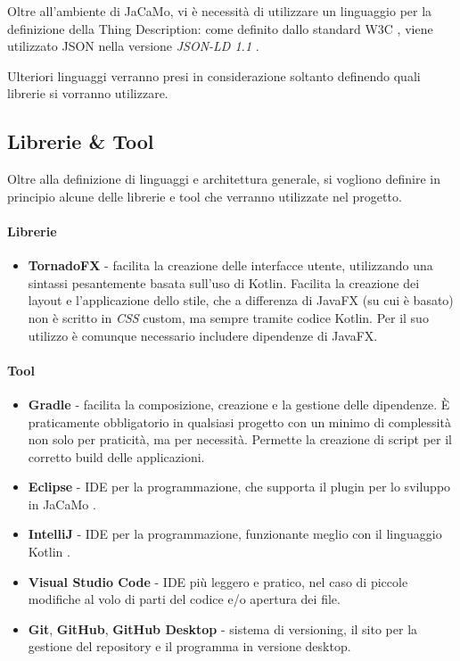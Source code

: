 \documentclass[12pt,a4paper,openright,oneside]{report}
\begin{document}
Oltre all'ambiente di JaCaMo, vi è necessità di utilizzare un linguaggio per la definizione della Thing Description: come definito dallo standard W3C \cite{td}, viene utilizzato JSON nella versione \textit{JSON-LD 1.1} \cite{json-ld}.

Ulteriori linguaggi verranno presi in considerazione soltanto definendo quali librerie si vorranno utilizzare.


\subsection{Librerie \& Tool}
Oltre alla definizione di linguaggi e architettura generale, si vogliono definire in principio alcune delle librerie e tool che verranno utilizzate nel progetto.

\paragraph{Librerie}
\begin{itemize}
	\item \textbf{TornadoFX} \cite{tornadofx} - facilita la creazione delle interfacce utente, utilizzando una sintassi pesantemente basata sull'uso di Kotlin. Facilita la creazione dei layout e l'applicazione dello stile, che a differenza di JavaFX (su cui è basato) non è scritto in \textit{CSS} custom, ma sempre tramite codice Kotlin. Per il suo utilizzo è comunque necessario includere dipendenze di JavaFX.
\end{itemize}
	
\paragraph{Tool}
\begin{itemize}
	\item \textbf{Gradle} \cite{gradle} - facilita la composizione, creazione e la gestione delle dipendenze. È praticamente obbligatorio in qualsiasi progetto con un minimo di complessità non solo per praticità, ma per necessità. Permette la creazione di script per il corretto build delle applicazioni.
	
	\item \textbf{Eclipse} \cite{eclipse} - IDE per la programmazione, che supporta il plugin per lo sviluppo in JaCaMo  \cite{eclipse-j}.
	
	\item \textbf{IntelliJ} \cite{intellij} - IDE per la programmazione, funzionante meglio con il linguaggio Kotlin  \cite{intellij-k}.
	
	\item \textbf{Visual Studio Code} \cite{visualstudiocode} - IDE più leggero e pratico, nel caso di piccole modifiche al volo di parti del codice e/o apertura dei file.
	
	\item \textbf{Git}, \textbf{GitHub}, \textbf{GitHub Desktop} \cite{git} - sistema di versioning, il sito per la gestione del repository e il programma in versione desktop.
\end{itemize}
\end{document}
